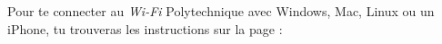 Pour te connecter au \emph{Wi-Fi} Polytechnique avec Windows, Mac, Linux ou un iPhone, tu trouveras les instructions sur la page :
\begin{center}
\end{center}


%
%






